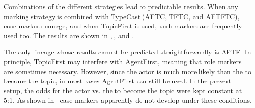 \documentclass[output=paper]{LSP/langsci}
\begin{document}
Combinations of the different strategies lead to predictable results. When any marking strategy is combined with TypeCast (AFTC, TFTC, and AFTFTC), case markers emerge, and when TopicFirst is used, verb markers are frequently used too. The results are shown in , , and .

The only lineage whose results cannot be predicted straightforwardly is AFTF. In principle, TopicFirst may interfere with AgentFirst, meaning that role markers are sometimes necessary. However, since the actor is much more likely than the  to become the topic, in most cases AgentFirst can still be used. In the present setup, the odds for the actor vs. the  to become the topic were kept constant at 5:1. As shown in , case markers apparently do not develop under these conditions.

\begin{table}
\caption{Representations of three most frequent words of the AFTF lineage. \label{AFTF3}}
\end{table}
\end{document}
